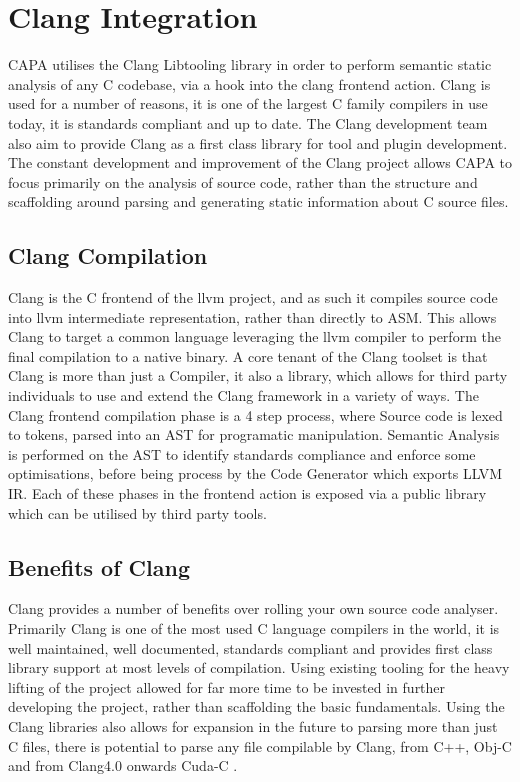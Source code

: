 
\section{Clang Integration} %
CAPA utilises the Clang Libtooling library in order to perform semantic static analysis of any C
codebase, via a hook into the clang frontend action. Clang is used for a number of reasons, it is
one of the largest C family compilers in use today, it is standards compliant and up to date. The
Clang development team also aim to provide Clang as a first class library for tool and plugin
development. The constant development and improvement of the Clang project allows CAPA to focus
primarily on the analysis of source code, rather than the structure and scaffolding around parsing
and generating static information about C source files.

\subsection{Clang Compilation}
Clang is the C frontend of the llvm project, and as such it compiles source code into llvm
intermediate representation, rather than directly to ASM. This allows Clang to target a common
language leveraging the llvm compiler to perform the final compilation to a native binary. A core
tenant of the Clang toolset is that Clang is more than just a Compiler, it also a library, which
allows for third party individuals to use and extend the Clang framework in a variety of ways.
\cite{clangFeatures}
The Clang frontend compilation phase is a 4 step process, where Source code is lexed to tokens,
parsed into an AST for programatic manipulation. Semantic Analysis is performed on the AST to
identify standards compliance and enforce some optimisations, before being process by the Code
Generator which exports LLVM IR. Each of these phases in the frontend action is exposed via a public
library which can be utilised by third party tools.

\subsection{Benefits of Clang}
Clang provides a number of benefits over rolling your own source code analyser. Primarily Clang is
one of the most used C language compilers in the world, it is well maintained, well documented,
standards compliant and provides first class library support at most levels of compilation. Using
existing tooling for the heavy lifting of the project allowed for far more time to be invested in
further developing the project, rather than scaffolding the basic fundamentals. Using the Clang
libraries also allows for expansion in the future to parsing more than just C files, there is
potential to parse any file compilable by Clang, from C++, Obj-C and from Clang4.0 onwards Cuda-C
\cite{clangFeatures}.

